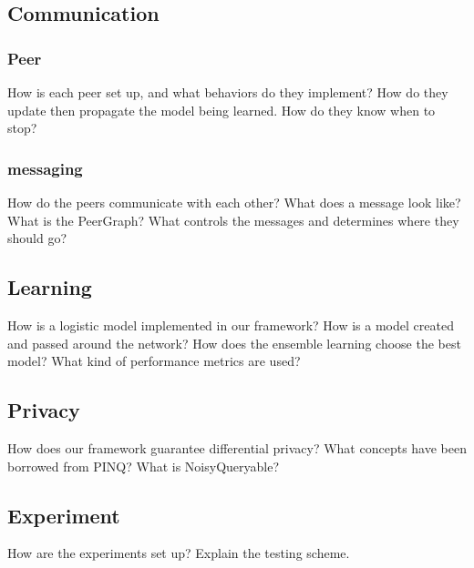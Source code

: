 \subsection{Communication}
\subsubsection{Peer}
How is each peer set up, and what behaviors do they implement? 
How do they update then propagate the model being learned.
How do they know when to stop?
\subsubsection{messaging}
How do the peers communicate with each other?
What does a message look like?
What is the PeerGraph?
What controls the messages and determines where they should go?

\subsection{Learning}
How is a logistic model implemented in our framework?
How is a model created and passed around the network?
How does the ensemble learning choose the best model?
What kind of performance metrics are used?

\subsection{Privacy}
How does our framework guarantee differential privacy?
What concepts have been borrowed from PINQ?
What is NoisyQueryable?

\subsection{Experiment}
How are the experiments set up?
Explain the testing scheme.



\cleardoublepage